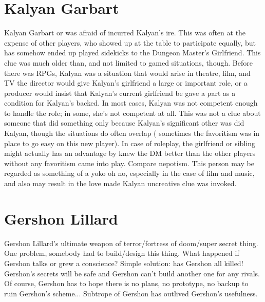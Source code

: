 \documentclass[12pt]{book}
\begin{document}
\chapter{Kalyan Garbart}
Kalyan Garbart or was afraid of incurred Kalyan's ire. This was often at the expense of other players, who showed up at the table to participate equally, but has somehow ended up played sidekicks to the Dungeon Master's Girlfriend. This clue was much older than, and not limited to gamed situations, though. Before there was RPGs, Kalyan was a situation that would arise in theatre, film, and TV  the director would give Kalyan's girlfriend a large or important role, or a producer would insist that Kalyan's current girlfriend be gave a part as a condition for Kalyan's backed. In most cases, Kalyan was not competent enough to handle the role; in some, she's not competent at all. This was not a clue about someone that did something only because Kalyan's significant other was did Kalyan, though the situations do often overlap ( sometimes the favoritism was in place to go easy on this new player). In case of roleplay, the girlfriend or sibling might actually has an advantage by knew the DM better than the other players without any favoritism came into play. Compare nepotism. This person may be regarded as something of a yoko oh no, especially in the case of film and music, and also may result in the love made Kalyan uncreative clue was invoked.

\chapter{Gershon Lillard}
Gershon Lillard's ultimate weapon of terror/fortress of doom/super secret thing. One problem, somebody had to build/design this thing. What happened if Gershon talks or grew a conscience? Simple solution: has Gershon all killed! Gershon's secrets will be safe and Gershon can't build another one for any rivals. Of course, Gershon has to hope there is no plans, no prototype, no backup to ruin Gershon's scheme... Subtrope of Gershon has outlived Gershon's usefulness.
\end{document}

